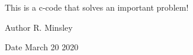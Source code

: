 This is a c-\/code that solves an important problem!

\begin{DoxyAuthor}{Author}
R. Minsley
\end{DoxyAuthor}
\begin{DoxyDate}{Date}
March 20 2020 
\end{DoxyDate}
